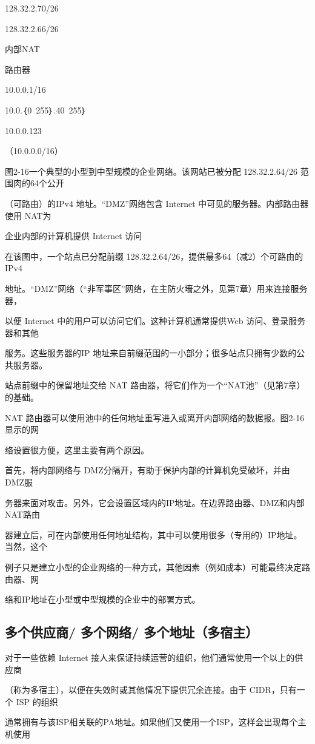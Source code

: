 128.32.2.70/26

128.32.2.66/26

内部NAT

路由器

10.0.0.1/16

10.0.｛0~255｝.40~255｝

10.0.0.123

（10.0.0.0/16）

图2-16一个典型的小型到中型规模的企业网络。该网站已被分配 128.32.2.64/26 范围肉的64个公开

（可路由）的IPv4 地址。“DMZ”网络包含 Internet 中可见的服务器。内部路由器使用 NAT为

企业内部的计算机提供 Internet 访问

在该图中，一个站点已分配前缀 128.32.2.64/26，提供最多64（减2）个可路由的IPv4

地址。“DMZ”网络（“非军事区”网络，在主防火墻之外，见第7章）用来连接服务器，

以便 Internet 中的用户可以访问它们。这种计算机通常提供Web 访问、登录服务器和其他

服务。这些服务器的IP 地址来自前缀范围的一小部分；很多站点只拥有少数的公共服务器。

站点前缀中的保留地址交给 NAT 路由器，将它们作为一个“NAT池”（见第7章）的基础。

NAT 路由器可以使用池中的任何地址重写进入或离开内部网络的数据报。图2-16显示的网

络设置很方便，这里主要有两个原因。

首先，将内部网络与 DMZ分隔开，有助于保护内部的计算机免受破坏，并由 DMZ服

务器来面对攻击。另外，它会设置区域内的IP地址。在边界路由器、DMZ和内部 NAT路由

器建立后，可在内部使用任何地址结构，其中可以使用很多（专用的）IP地址。当然，这个

例子只是建立小型的企业网络的一种方式，其他因素（例如成本）可能最终决定路由器、网

络和IP地址在小型或中型规模的企业中的部署方式。

\subsection{多个供应商/ 多个网络/ 多个地址（多宿主）}
对于一些依赖 Internet 接人来保证持续运营的组织，他们通常使用一个以上的供应商

（称为多宿主），以便在失效时或其他情况下提供冗余连接。由于 CIDR，只有一个 ISP 的组织

通常拥有与该ISP相关联的PA地址。如果他们又使用一个ISP，这样会出现每个主机使用

